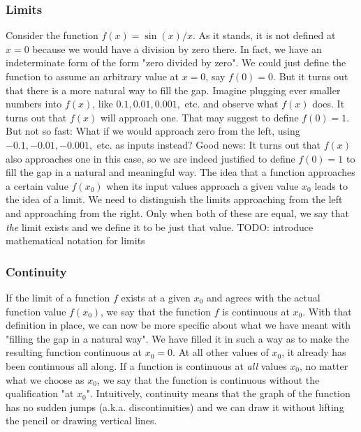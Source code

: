 \subsubsection{Limits}
Consider the function $f(x) = \sin (x) / x$. As it stands, it is not defined at $x = 0$ because we would have a division by zero there. In fact, we have an indeterminate form of the form "zero divided by zero". We could just define the function to assume an arbitrary value at $x = 0$, say $f(0) = 0$. But it turns out that there is a more natural way to fill the gap. Imagine plugging ever smaller numbers into $f(x)$, like $0.1, 0.01, 0.001, $ etc. and observe what $f(x)$ does. It turns out that $f(x)$ will approach one. That may suggest to define $f(0) = 1$. But not so fast: What if we would approach zero from the left, using $-0.1, -0.01, -0.001,$ etc. as inputs instead? Good news: It turns out that $f(x)$ also approaches one in this case, so we are indeed justified to define $f(0)=1$ to fill the gap in a natural and meaningful way. The idea that a function approaches a certain value $f(x_0)$ when its input values approach a given value $x_0$ leads to the idea of a limit. We need to distinguish the limits approaching from the left and approaching from the right. Only when both of these are equal, we say that \emph{the} limit exists and we define it to be just that value. 
TODO: introduce mathematical notation for limits


\subsubsection{Continuity}
If the limit of a function $f$ exists at a given $x_0$ and agrees with the actual function value $f(x_0)$, we say that the function $f$ is continuous at $x_0$. With that definition in place, we can now be more specific about what we have meant with "filling the gap in a natural way". We have filled it in such a way as to make the resulting function continuous at $x_0 = 0$. At all other values of $x_0$, it already has been continuous all along. If a function is continuous at \emph{all} values $x_0$, no matter what we choose as $x_0$, we say that the function is continuous without the qualification "at $x_0$". Intuitively, continuity means that the graph of the function has no sudden jumps (a.k.a. discontinuities) and we can draw it without lifting the pencil or drawing vertical lines.


